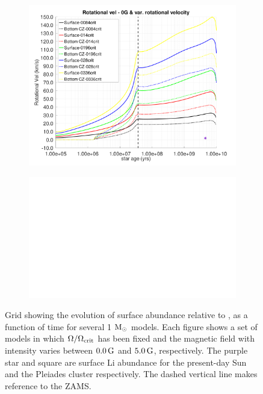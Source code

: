 \documentclass[fleqn,usenatbib]{mnras}
\begin{document}
\begin{figure}
\begin{subfigure}[h]{0.47\textwidth}
    \includegraphics[clip,width=\textwidth]{figures/paper1/rot_vel_var_vel_0_0g.pdf}
    \label{fig:subim23}
    \end{subfigure}    
    \begin{subfigure}[h]{0.47\textwidth}
    \includegraphics[width=\textwidth]{figures/blank.eps}
    \label{fig:subim24}
    \end{subfigure}
\caption{Grid showing the evolution of surface  abundance relative to , as a function of time for several 1 $\mathrm{M}_\odot$ models. Each figure shows a set of models in which $\Omega / \Omega_{\mathrm{crit}}$ has been fixed and the magnetic field with intensity varies between $0.0\,\mathrm{G}$ and $5.0\,\mathrm{G}$, respectively. The purple star and square are surface Li abundance for the present-day Sun \citep{Asplund2009} and the Pleiades cluster \citep{Sestito2005} respectively. The dashed vertical line makes reference to the ZAMS.}
\label{fig:grid_li_var_g}
\end{figure}
\end{document}
